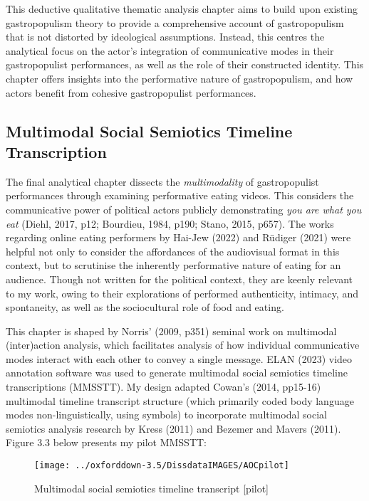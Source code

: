 \documentclass[a4paper, nobind]{templates/ociamthesis}
\begin{document}
This deductive qualitative thematic analysis chapter aims to build upon existing gastropopulism theory to provide a comprehensive account of gastropopulism that is not distorted by ideological assumptions. Instead, this centres the analytical focus on the actor's integration of communicative modes in their gastropopulist performances, as well as the role of their constructed identity. This chapter offers insights into the performative nature of gastropopulism, and how actors benefit from cohesive gastropopulist performances.

\hypertarget{multimodal-social-semiotics-timeline-transcription}{%
\subsection*{Multimodal Social Semiotics Timeline Transcription}\label{multimodal-social-semiotics-timeline-transcription}}

The final analytical chapter dissects the \emph{multimodality} of gastropopulist performances through examining performative eating videos. This considers the communicative power of political actors publicly demonstrating \emph{you are what you eat} (Diehl, 2017, p12; Bourdieu, 1984, p190; Stano, 2015, p657). The works regarding online eating performers by Hai-Jew (2022) and Rüdiger (2021) were helpful not only to consider the affordances of the audiovisual format in this context, but to scrutinise the inherently performative nature of eating for an audience. Though not written for the political context, they are keenly relevant to my work, owing to their explorations of performed authenticity, intimacy, and spontaneity, as well as the sociocultural role of food and eating.

This chapter is shaped by Norris' (2009, p351) seminal work on multimodal (inter)action analysis, which facilitates analysis of how individual communicative modes interact with each other to convey a single message. ELAN (2023) video annotation software was used to generate multimodal social semiotics timeline transcriptions (MMSSTT). My design adapted Cowan's (2014, pp15-16) multimodal timeline transcript structure (which primarily coded body language modes non-linguistically, using symbols) to incorporate multimodal social semiotics analysis research by Kress (2011) and Bezemer and Mavers (2011). Figure 3.3 below presents my pilot MMSSTT:

\begin{figure}
\texttt{[image: ../oxforddown-3.5/DissdataIMAGES/AOCpilot]} \caption{Multimodal social semiotics timeline transcript [pilot]}\label{fig:unnamed-chunk-5}
\end{figure}
\end{document}
